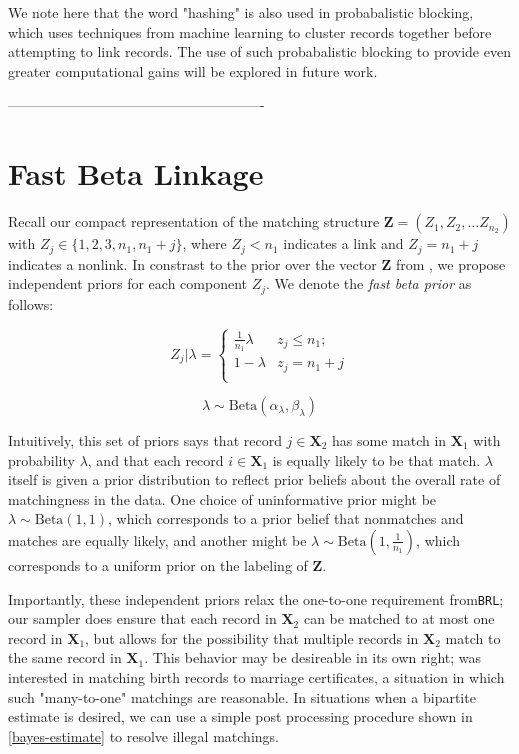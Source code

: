 \documentclass[12pt,letterpaper]{article}
\newcommand{\1}[1]{\mathbb{I}\!\left[#1\right]} %
\begin{document}
{We note here that the word "hashing" is also used in probabalistic blocking, which uses techniques from machine learning to cluster records together before attempting to link records. The use of such probabalistic blocking to provide even greater computational gains will be explored in future work. 

-------------------------------------------------------

\section{Fast Beta Linkage}
\label{sec:fast-beta-linkage}

Recall our compact representation of the matching structure $\bm{Z} = (Z_1, Z_2, \ldots Z_{n_2})$ with $Z_j \in \{1,2, 3, n_1, n_1 + j\}$, where $Z_j < n_1$ indicates a link and $Z_j = n_1 + j$ indicates a nonlink. In constrast to the prior over the vector $\bm{Z}$ from \cite{sadinle_bayesian_2017}, we propose independent priors for each component $Z_j$. We denote the \emph{fast beta prior} as follows:


\[Z_j | \lambda =
\begin{cases} 
	\frac{1}{n_1}\lambda  & z_j \leq n_1; \\
	1-\lambda &  z_j  = n_1 + j \\
\end{cases}\]

\[\lambda \sim \text{Beta}(\alpha_{\lambda}, \beta_{\lambda}) \] 


Intuitively, this set of priors says that record $j \in \bm{X}_2$ has some match in $\bm{X}_1$ with probability $\lambda$, and that each record $i \in \bm{X}_1$ is equally likely to be that match. $\lambda$ itself is given a prior distribution to reflect prior beliefs about the overall rate of matchingness in the data. One choice of uninformative prior might be \(\lambda \sim \text{Beta}(1, 1)\), which corresponds to a prior belief that nonmatches and matches are equally likely, and another might be \(\lambda \sim \text{Beta}\left(1, \frac{1}{n_1}\right)\), which corresponds to a uniform prior on the labeling of \(\mathbf{Z}\).

Importantly, these independent priors relax the one-to-one requirement from\texttt{BRL}; our sampler does ensure that each record in \(\bm{X}_2\) can be matched to at most one record in \(\bm{X}_1\), but allows for the possibility that multiple records in \(\bm{X}_2\) match to the same record in \(\bm{X}_1\). This behavior may be desireable in its own right; \cite{Newcombe1962b} was interested in matching birth records to marriage certificates, a situation in which such "many-to-one" matchings are reasonable. In situations when a bipartite estimate is desired, we can use a simple post processing procedure shown in \ref{bayes-estimate} to resolve illegal matchings.  

}
\end{document}
